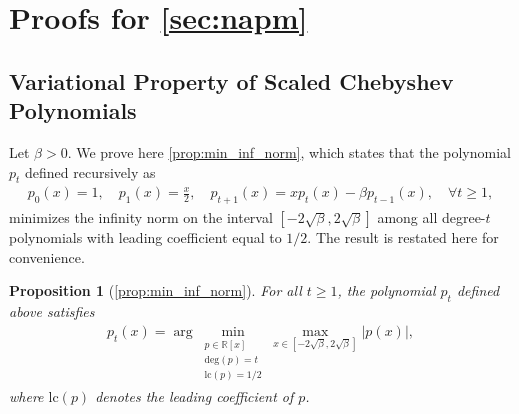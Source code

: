 \documentclass{article}
\theoremstyle{plain}
\newtheorem{proposition}[theorem]{Proposition}
\theoremstyle{definition}
\theoremstyle{remark}
\begin{document}
\section{Proofs for \cref{sec:napm}}

\subsection{Variational Property of Scaled Chebyshev Polynomials}

Let $\beta > 0$. We prove here \cref{prop:min_inf_norm}, which states that the polynomial $p_t$ defined recursively as
\begin{align*}
  p_0(x) = 1, \quad p_1(x) = \frac{x}{2}, \quad p_{t+1}(x) = x p_t(x) - \beta p_{t-1}(x), \quad \forall t\geqslant 1,
\end{align*}
minimizes the infinity norm on the interval $[-2\sqrt{\beta}, 2\sqrt{\beta}]$ among all degree-$t$ polynomials with leading coefficient equal to $1/2$. The result is restated here for convenience.

\begin{proposition}[\cref{prop:min_inf_norm}]\label{prop:min_inf_norm_apdx}
  For all $t\geqslant 1$, the polynomial $p_t$ defined above satisfies
  \begin{align}\label{eq:pt_variational_apdx}
    p_t(x) = \arg \min_{\substack{p \in \mathbb{R}[x] \\ \mathrm{deg}(p) = t \\ \mathrm{lc}(p) = 1/2}} \max_{x \in [-2\sqrt{\beta}, 2\sqrt{\beta}]} |p(x)|,
  \end{align}
  where $\mathrm{lc}(p)$ denotes the leading coefficient of $p$.
\end{proposition}
\end{document}
